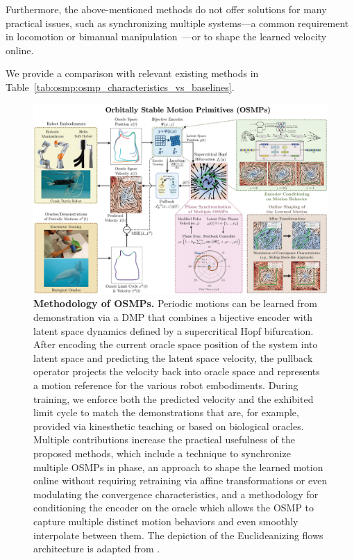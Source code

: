 Furthermore, the above-mentioned methods do not offer solutions for many practical issues, such as synchronizing multiple systems—a common requirement in locomotion or bimanual manipulation~\citep{gams2015accelerating}—or to shape the learned velocity online.

We provide a comparison with relevant existing methods in Table~\ref{tab:osmp:osmp_characteristics_vs_baselines}.

\begin{figure}[h!]
    \centering
    \includegraphics[width=1.0\linewidth]{osmp/figures/methodology_overview/osmp_methodology_overview_v3_compressed.pdf}
    \caption{
    \textbf{Methodology of \glspl{OSMP}.}
    Periodic motions can be learned from demonstration via a \gls{DMP} that combines a bijective encoder with latent space dynamics defined by a supercritical Hopf bifurcation. After encoding the current oracle space position of the system into latent space and predicting the latent space velocity, the pullback operator projects the velocity back into oracle space and represents a motion reference for the various robot embodiments. During training, we enforce both the predicted velocity and the exhibited limit cycle to match the demonstrations that are, for example, provided via kinesthetic teaching or based on biological oracles.
    Multiple contributions increase the practical usefulness of the proposed methods, which include a technique to synchronize multiple \glspl{OSMP} in phase, an approach to shape the learned motion online without requiring retraining via affine transformations or even modulating the convergence characteristics, and a methodology for conditioning the encoder on the oracle which allows the \gls{OSMP} to capture multiple distinct motion behaviors and even smoothly interpolate between them.
    The depiction of the Euclideanizing flows architecture is adapted from \citet{rana2020euclideanizing}.
    }
    \label{fig:osmp:methodology_overview}
\end{figure}


